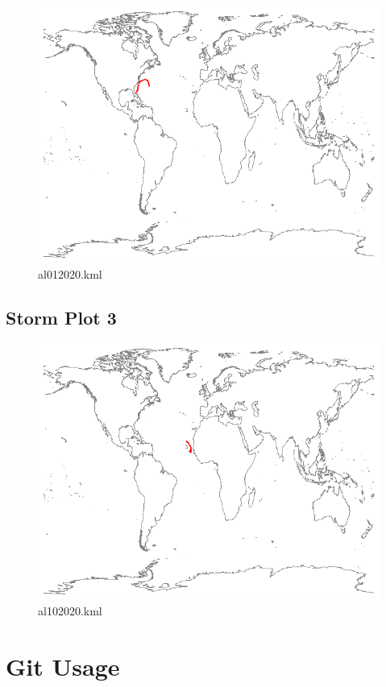 \documentclass[]{article}
\begin{document}
\begin{figure}[htbp]
    \centering
\includegraphics{al012020.png}
\caption{al012020.kml}
\label{fig:al012020}
\end{figure}

\clearpage
\subsection{Storm Plot 3}

\begin{figure}[htbp]
    \centering
\includegraphics{al102020.png}
\caption{al102020.kml}
\label{fig:al102020}
\end{figure}
\clearpage
\section{Git Usage}
\end{document}
